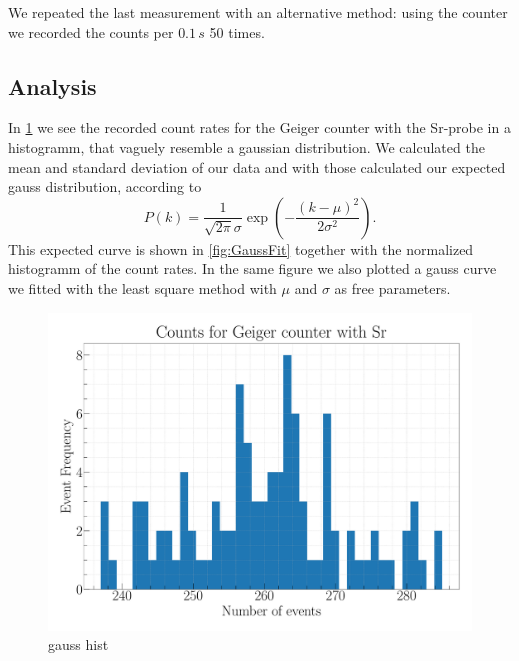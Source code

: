 We repeated the last measurement with an alternative method: using the counter we recorded the counts per $0.1\,s$ 50 times.

\subsection{Analysis}

In \cref{fig:GaussHist} we see the recorded count rates for the Geiger counter with the Sr-probe in a histogramm, that vaguely resemble a gaussian distribution. We calculated the mean and standard deviation of our data and with those calculated our expected gauss distribution, according to
\begin{equation}
P(k) = \frac{1}{\sqrt{2\pi}\sigma} \exp(-\frac{(k-\mu)^2}{2\sigma^2}).
\end{equation}
This expected curve is shown in \cref{fig:GaussFit} together with the normalized histogramm of the count rates. In the same figure we also plotted a gauss curve we fitted with the least square method with $\mu$ and $\sigma$ as free parameters.

\begin{figure}[H]
\centering
\includegraphics[width=\textwidth]{../Figures/Geiger_gauss_histogram.pdf}
\caption{gauss hist}
\label{fig:GaussHist}
\end{figure}

